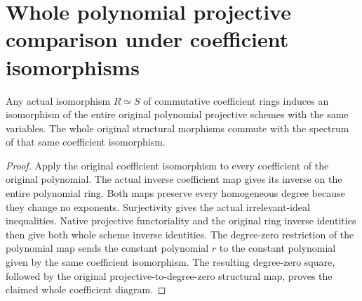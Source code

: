 \section{Whole polynomial projective comparison under coefficient isomorphisms}
\label{sec:polynomial-projective-coefficient-isomorphism}

\begin{theorem}
\label{thm:polynomial-projective-coefficient-isomorphism}
\leanok
{}
Any actual isomorphism $R\simeq S$ of commutative coefficient rings
induces an isomorphism of the entire original polynomial projective
schemes with the same variables. The whole original structural
morphisms commute with the spectrum of that same coefficient
isomorphism.
\end{theorem}

\begin{proof}
Apply the original coefficient isomorphism to every coefficient of
the original polynomial. The actual inverse coefficient map gives
its inverse on the entire polynomial ring. Both maps preserve every
homogeneous degree because they change no exponents. Surjectivity
gives the actual irrelevant-ideal inequalities. Native projective
functoriality and the original ring inverse identities then give
both whole scheme inverse identities. The degree-zero restriction
of the polynomial map sends the constant polynomial $r$ to the
constant polynomial given by the same coefficient isomorphism.
The resulting degree-zero square, followed by the original
projective-to-degree-zero structural map, proves the claimed
whole coefficient diagram.
\end{proof}
